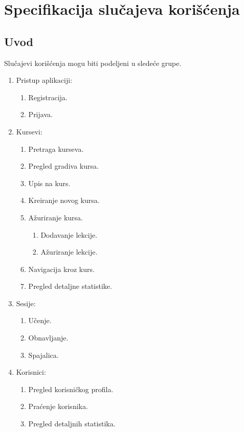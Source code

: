 \part{Specifikacija slučajeva korišćenja}
\label{part:use-case}

\chapter{Uvod}
\label{ch:use-case-uvod}
Slučajevi korišćenja mogu biti podeljeni u sledeće grupe.
\begin{enumerate}
  \item Pristup aplikaciji:
  \begin{enumerate}
    \item Registracija.
    \item Prijava.
  \end{enumerate}
  \item Kursevi:
  \begin{enumerate}
    \item Pretraga kurseva.
	\item Pregled gradiva kursa.
    \item Upis na kurs.
    \item Kreiranje novog kursa.
    \item Ažuriranje kursa.
    \begin{enumerate}
      \item Dodavanje lekcije.
      \item Ažuriranje lekcije.
    \end{enumerate}
    \item Navigacija kroz kurs.
    \item Pregled detaljne statistike.
  \end{enumerate}
  \item Sesije:
  \begin{enumerate}
    \item Učenje.
    \item Obnavljanje.
    \item Spajalica.
  \end{enumerate}
  \item Korisnici:
  \begin{enumerate}
    \item Pregled korisničkog profila.
    \item Praćenje korisnika.
    \item Pregled detaljnih statistika.
  \end{enumerate}
\end{enumerate}



